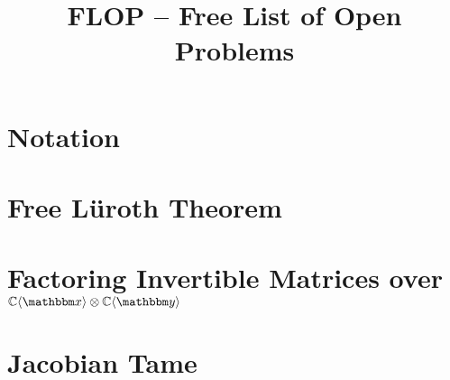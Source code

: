 \documentclass[letterpaper,reqno]{amsart}
\title{FLOP -- Free List of Open Problems}
\numberwithin{equation}{section}
\begin{document}
\maketitle

\tableofcontents


\section{Notation}




\section{Free L{\"u}roth Theorem}
	\label{sec:Luroth}



\bigskip




\section{Factoring Invertible Matrices over $\C\fralg{\bbx}\otimes \C\fralg{\bby}$}
	\label{sec:Elem_Mats}



\bigskip




\section{Jacobian Tame}
	\label{sec:Jac Tame}



\bigskip

\end{document}
